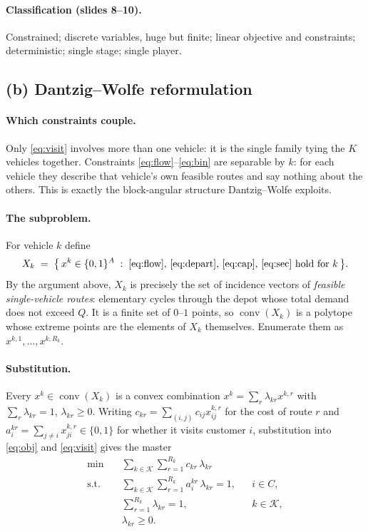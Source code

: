 \documentclass[11pt]{article}
\DeclareMathOperator*{\minimize}{min}
\DeclareMathOperator{\conv}{conv}
\begin{document}
\paragraph{Classification (slides 8--10).} Constrained; discrete
variables, huge but finite; linear objective and constraints;
deterministic; single stage; single player.

\subsection{(b) Dantzig--Wolfe reformulation}

\paragraph{Which constraints couple.} Only \eqref{eq:visit} involves
more than one vehicle: it is the single family tying the $K$ vehicles
together. Constraints \eqref{eq:flow}--\eqref{eq:bin} are separable by
$k$: for each vehicle they describe that vehicle's own feasible routes
and say nothing about the others. This is exactly the block-angular
structure Dantzig--Wolfe exploits.

\paragraph{The subproblem.} For vehicle $k$ define
\[
  X_k \;=\; \bigl\{\, x^k \in \{0,1\}^{A} \;:\;
    \eqref{eq:flow},\,\eqref{eq:depart},\,\eqref{eq:cap},\,\eqref{eq:sec}
    \text{ hold for } k \,\bigr\} .
\]
By the argument above, $X_k$ is precisely the set of incidence vectors
of \emph{feasible single-vehicle routes}: elementary cycles through the
depot whose total demand does not exceed $Q$. It is a finite set of
$0$--$1$ points, so $\conv(X_k)$ is a polytope whose extreme points are
the elements of $X_k$ themselves. Enumerate them as
$x^{k,1},\dots,x^{k,R_k}$.

\paragraph{Substitution.} Every $x^k \in \conv(X_k)$ is a convex
combination $x^k = \sum_{r} \lambda_{kr} x^{k,r}$ with
$\sum_r \lambda_{kr} = 1$, $\lambda_{kr} \ge 0$. Writing
$c_{kr} = \sum_{(i,j)} c_{ij} x^{k,r}_{ij}$ for the cost of route $r$
and $a_{i}^{kr} = \sum_{j \neq i} x^{k,r}_{ji} \in \{0,1\}$ for whether
it visits customer $i$, substitution into \eqref{eq:obj} and
\eqref{eq:visit} gives the master
\begin{align}
  \minimize \quad & \sum_{k \in \mathcal{K}} \sum_{r=1}^{R_k}
      c_{kr}\, \lambda_{kr}\\
  \text{s.t.}\quad
  & \sum_{k \in \mathcal{K}} \sum_{r=1}^{R_k}
      a_i^{kr}\, \lambda_{kr} = 1, && i \in C,\\
  & \sum_{r=1}^{R_k} \lambda_{kr} = 1, && k \in \mathcal{K},\\
  & \lambda_{kr} \ge 0 .
\end{align}
\end{document}
